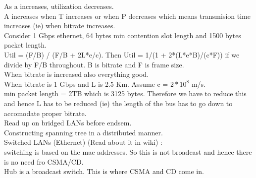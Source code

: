 \documentclass[solution,addpoints,12pt]{exam}
\begin{document}
As a increases, utilization decreases.\\
A increases when T increases or when P decreases which means transmision time
increases (ie) when bitrate increases.\\
Consider 1 Gbps ethernet, 64 bytes min contention slot
length and 1500 bytes packet length.\\
Util = (F/B) / (F/B + 2L*e/c). Then Util = 1/(1 + 2*(L*e*B)/(c*F)) if
we divide by F/B throughout. B is bitrate and F is frame size.\\
When bitrate is increased also everything good.\\
When bitrate is 1 Gbps and L is 2.5 Km. Assume c = $2*10^8$ m/s.\\
min packet length = 2TB which is 3125 bytes. Therefore we have to reduce
this and hence L has to be reduced (ie) the length of the bus
has to go down to accomodate proper bitrate.\\

Read up on bridged LANs before endsem.\\
Constructing spanning tree in a distributed manner.\\
Switched LANs (Ethernet) (Read about it in wiki) :\\
switching is based on the mac addresses. So this is not broadcast
and hence there is no need fro CSMA/CD.\\
Hub is a broadcast switch. This is where CSMA and CD come in.\\
\end{document}
